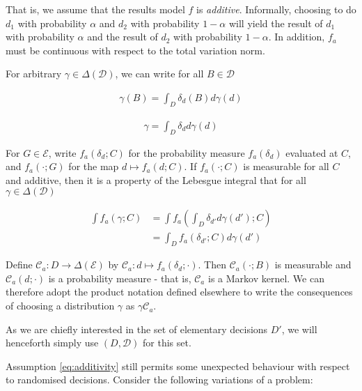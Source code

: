 That is, we assume that the results model $f$ is \emph{additive}. Informally, choosing to do $d_1$ with probability $\alpha$ and $d_2$ with probability $1-\alpha$ will yield the result of $d_1$ with probability $\alpha$ and the result of $d_2$ with probability $1-\alpha$. In addition, $f_a$ must be continuous with respect to the total variation norm.

For arbitrary $\gamma\in \Delta(\mathcal{D})$, we can write for all $B\in \mathcal{D}$

\begin{align}
	\gamma (B) = \int_D \delta_d(B) d\gamma(d)
\end{align}


\begin{align}
	\gamma = \int_D \delta_d d\gamma(d)
\end{align}

For $G\in \mathcal{E}$, write $f_a(\delta_d;C)$ for the probability measure $f_a(\delta_d)$ evaluated at $C$, and $f_a(\cdot;G)$ for the map $d\mapsto f_a(d;C)$. If $f_a(\cdot; C)$ is measurable for all $C$ and additive, then it is a property of the Lebesgue integral that for all $\gamma\in \Delta(\mathcal{D})$

\begin{align}
	\int f_a(\gamma ;C) &= \int f_a(\int_D \delta_{d'}d\gamma(d') ;C)\\
											   &=\int_D f_a(\delta_{d'};C) d\gamma(d')
\end{align}

Define $\mathscr{C}_a:D\to \Delta(\mathcal{E})$ by $\mathscr{C}_a:d\mapsto f_a(\delta_{d};\cdot)$. Then $\mathscr{C}_a(\cdot;B)$ is measurable and $\mathscr{C}_a(d;\cdot)$ is a probability measure - that is, $\mathscr{C}_a$ is a Markov kernel. We can therefore adopt the product notation defined elsewhere to write the consequences of choosing a distribution $\gamma$ as $\gamma \mathscr{C}_a$.


As we are chiefly interested in the set of elementary decisions $D'$, we will henceforth simply use $(D,\mathcal{D})$ for this set.

Assumption \ref{eq:additivity} still permits some unexpected behaviour with respect to randomised decisions. Consider the following variations of a problem:

